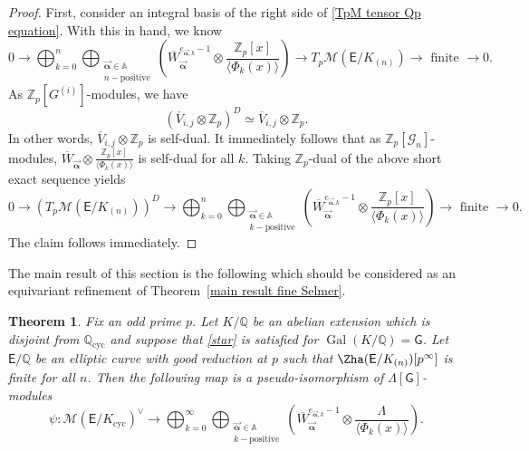 \documentclass{amsart}
\newtheorem{theorem}{Theorem}[section]
\numberwithin{equation}{section}
\theoremstyle{remark}
\newcommand{\val}{\vec{\boldsymbol{\alpha}}}
\newcommand{\EC}{\mathsf{E}}
\newcommand{\cG}{\mathcal{G}}
\newcommand{\cM}{\mathcal{M}}
\newcommand{\Gal}{\operatorname{Gal}}
\newcommand{\sG}{\mathsf{G}}
\newcommand{\Zp}{\mathbb{Z}_p}
\newcommand{\A}{\mathbb{A}}
\newcommand{\Q}{\mathbb{Q}}
\newcommand{\cyc}{\operatorname{{cyc}}}
\theoremstyle{plain} %
\begin{document}
\begin{proof}
First, consider an integral basis of the right side of \eqref{TpM tensor Qp equation}.
With this in hand, we know
\[
0 \longrightarrow \bigoplus_{k=0}^n \bigoplus_{\substack{\val\in \A\\ n-\text{positive}}} \left( \overline{W}_{\val}^{e_{\val,k}-1} \otimes \frac{\Zp[x]}{\langle \Phi_k(x)\rangle} \right) \longrightarrow T_p\cM(\EC/K_{(n)}) \longrightarrow \text{ finite } \longrightarrow 0.
\]
As $\Zp[G^{(i)}]$-modules, we have
\[
\left( \overline{V}_{i,j} \otimes \Zp \right)^D \simeq \overline{V}_{i,j} \otimes \Zp.
\]
In other words, $\overline{V}_{i,j} \otimes \Zp$ is self-dual.
It immediately follows that as $\Zp[\cG_n]$-modules, $\overline{W}_{\val} \otimes \frac{\Zp[x]}{\langle \Phi_k(x) \rangle}$ is self-dual for all $k$.
Taking $\Zp$-dual of the above short exact sequence yields
\[
0 \longrightarrow \left(T_p\cM(\EC/K_{(n)})\right)^D \longrightarrow \bigoplus_{k=0}^n \bigoplus_{\substack{\val\in \A\\ k-\text{positive}}} \left( \overline{W}_{\val}^{e_{\val,k}-1} \otimes \frac{\Zp[x]}{\langle \Phi_k(x)\rangle} \right) \longrightarrow \text{ finite } \longrightarrow 0.
\]
The claim follows immediately.
\end{proof}

The main result of this section is the following which should be considered as an equivariant refinement of Theorem~\ref{main result fine Selmer}.

\begin{theorem}
\label{thm 4.12}
Fix an odd prime $p$.
Let $K/\Q$ be an abelian extension which is disjoint from $\Q_{\cyc}$ and suppose that \ref{star} is satisfied for $\Gal(K/\Q) = \mathsf{G}$.
Let $\EC/\Q$ be an elliptic curve with good reduction at $p$ such that $\Zha(\EC/K_{(n)})[p^\infty]$ is finite for all $n$.
Then the following map is a pseudo-isomorphism of $\Lambda[\sG]$-modules
\[
\psi: \cM(\EC/K_{\cyc})^\vee \longrightarrow \bigoplus_{k=0}^\infty \bigoplus_{\substack{\val\in \A\\ k-\text{positive}}} \left( \overline{W}_{\val}^{e_{\val,k}-1} \otimes \frac{\Lambda}{\langle \Phi_k(x)\rangle} \right).
\]
\end{theorem}
\end{document}
